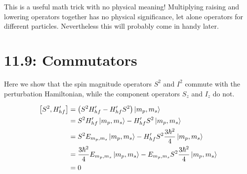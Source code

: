 \documentclass[10pt]{article} %
\begin{document}
This is a useful math trick with no physical meaning! Multiplying raising and lowering operators
together has no physical significance, let alone operators for different particles. Nevertheless
this will probably come in handy later.\\

\section{11.9: Commutators}
Here we show that the spin magnitude operators \textbf{$S^2$} and \textbf{$I^2$} commute with
the perturbation Hamiltonian, while the component operators \textbf{$S_z$} and \textbf{$I_z$}
do not.

\begin{align*}
  \left[S^2, H'_{hf}\right] &= \left(S^2H'_{hf} - H'_{hf}S^2\right)\ket{m_p,m_s}\\
  &= S^2H'_{hf}\ket{m_p,m_s} - H'_{hf}S^2\ket{m_p,m_s}\\
  &= S^2E_{m_p,m_s}\ket{m_p,m_s} - H'_{hf}S^2\frac{3\hbar^2}{4}\ket{m_p,m_s}\\
  &= \frac{3\hbar^2}{4}E_{m_p,m_s}\ket{m_p,m_s} - E_{m_p,m_s}S^2\frac{3\hbar^2}{4}\ket{m_p,m_s}\\
  &= 0\\
\end{align*}
\end{document}
